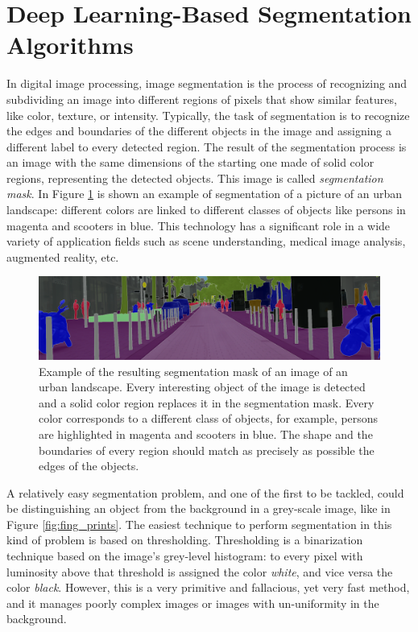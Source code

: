 \section{Deep Learning-Based Segmentation Algorithms} \label{ssec:segmentation}
In digital image processing, image segmentation is the process of recognizing and subdividing an image into different regions of pixels that show similar features, like color, texture, or intensity. Typically, the task of segmentation is to recognize the edges and boundaries of the different objects in the image and assigning a different label to every detected region. The result of the segmentation process is an image with the same dimensions of the starting one made of solid color regions, representing the detected objects. This image is called \textit{segmentation mask}. In Figure \ref{fig:seg_example} is shown an example of segmentation of a picture of an urban landscape: different colors are linked to different classes of objects like persons in magenta and scooters in blue. This technology has a significant role in a wide variety of application fields such as scene understanding, medical image analysis, augmented reality, etc.

\begin{figure}
    \centering
    \includegraphics[width = \textwidth]{images/seg_example}
    \caption{Example of the resulting segmentation mask of an image of an urban landscape. Every interesting object of the image is detected and a solid color region replaces it in the segmentation mask. Every color corresponds to a different class of objects, for example, persons are highlighted in magenta and scooters in blue. The shape and the boundaries of every region should match as precisely as possible the edges of the objects.}
    \label{fig:seg_example}
\end{figure}

A relatively easy segmentation problem, and one of the first to be tackled, could be distinguishing an object from the background in a grey-scale image, like in Figure \ref{fig:fing_prints}. The easiest technique to perform segmentation in this kind of problem is based on thresholding. Thresholding is a binarization technique based on the image's grey-level histogram: to every pixel with luminosity above that threshold is assigned the color \textit{white}, and vice versa the color \textit{black}. However, this is a very primitive and fallacious, yet very fast method, and it manages poorly complex images or images with un-uniformity in the background.

